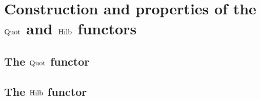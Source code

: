 \section{Construction and properties of the \texorpdfstring{$\mathrm{Quot}$}{} and \texorpdfstring{$\mathrm{Hilb}$}{} functors}
    \subsection{The \texorpdfstring{$\mathrm{Quot}$}{} functor}
    
    \subsection{The \texorpdfstring{$\mathrm{Hilb}$}{} functor}
